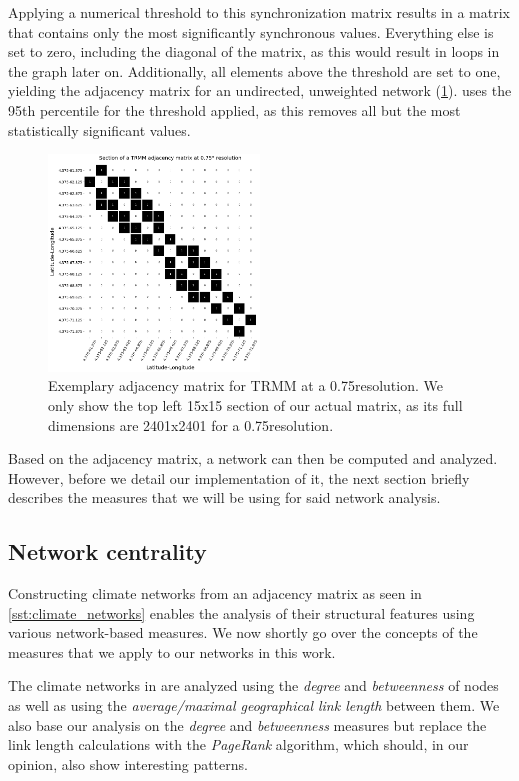 Applying a numerical threshold to this synchronization matrix results in a matrix that contains only the most significantly synchronous values. Everything else is set to zero, including the diagonal of the matrix, as this would result in loops in the graph later on. Additionally, all elements above the threshold are set to one, yielding the adjacency matrix for an undirected, unweighted network (\cref{fig:adjacency_matrix}). \citet{Stolbova.2015} uses the 95th percentile for the threshold applied, as this removes all but the most statistically significant values.

\begin{figure}[h]
  \centering
  \includegraphics[width=0.5\textwidth]{./99_appendix/img/trmm_adjacency_example}
  \caption{Exemplary adjacency matrix for TRMM at a 0.75\degree resolution. We only show the top left 15x15 section of our actual matrix, as its full dimensions are 2401x2401 for a 0.75\degree resolution.}
  \label{fig:adjacency_matrix}
\end{figure}

Based on the adjacency matrix, a network can then be computed and analyzed. However, before we detail our implementation of it, the next section briefly describes the measures that we will be using for said network analysis.

\subsection{Network centrality}
\label{sst:network_measures}
Constructing climate networks from an adjacency matrix as seen in \cref{sst:climate_networks} enables the analysis of their structural features using various network-based measures. We now shortly go over the concepts of the measures that we apply to our networks in this work.

The climate networks in \citet{Stolbova.2015} are analyzed using the \textit{degree} and \textit{betweenness} of nodes as well as using the \textit{average/maximal geographical link length} between them. We also base our analysis on the \textit{degree} and \textit{betweenness} measures but replace the link length calculations with the \textit{PageRank} algorithm, which should, in our opinion, also show interesting patterns.

